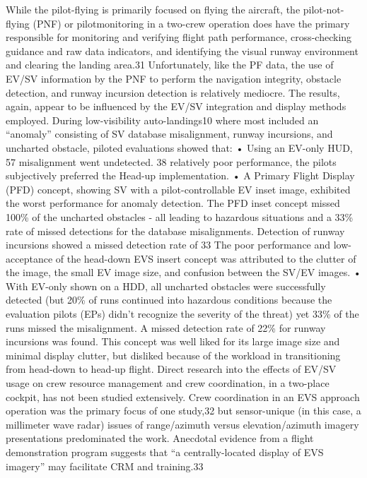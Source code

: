\documentclass[utf8,bachelor,manualbib]{gradu3}
\begin{document}
While the pilot-flying is primarily focused on flying the aircraft, the pilot-not-flying (PNF) or pilotmonitoring
in a two-crew operation does have the primary responsible for monitoring and verifying flight path
performance, cross-checking guidance and raw data indicators, and identifying the visual runway environment
and clearing the landing area.31 Unfortunately, like the PF data, the use of EV/SV information by the PNF to
perform the navigation integrity, obstacle detection, and runway incursion detection is relatively mediocre.
The results, again, appear to be influenced by the EV/SV integration and display methods employed.
During low-visibility auto-landings10 where most included an “anomaly” consisting of SV database
misalignment, runway incursions, and uncharted obstacle, piloted evaluations showed that:
• Using an EV-only HUD, 57%
misalignment went undetected. 38%
relatively poor performance, the pilots subjectively preferred the Head-up implementation.
• A Primary Flight Display (PFD) concept, showing SV with a pilot-controllable EV inset image,
exhibited the worst performance for anomaly detection. The PFD inset concept missed 100\% of the
uncharted obstacles - all leading to hazardous situations and a 33\% rate of missed detections for the
database misalignments. Detection of runway incursions showed a missed detection rate of 33%
The poor performance and low-acceptance of the head-down EVS insert concept was attributed to the
clutter of the image, the small EV image size, and confusion between the SV/EV images.
• With EV-only shown on a HDD, all uncharted obstacles were successfully detected (but 20\% of runs
continued into hazardous conditions because the evaluation pilots (EPs) didn’t recognize the severity
of the threat) yet 33\% of the runs missed the misalignment. A missed detection rate of 22\% for
runway incursions was found. This concept was well liked for its large image size and minimal
display clutter, but disliked because of the workload in transitioning from head-down to head-up
flight.
Direct research into the effects of EV/SV usage on crew resource management and crew coordination, in a
two-place cockpit, has not been studied extensively. Crew coordination in an EVS approach operation was
the primary focus of one study,32 but sensor-unique (in this case, a millimeter wave radar) issues of
range/azimuth versus elevation/azimuth imagery presentations predominated the work. Anecdotal evidence
from a flight demonstration program suggests that “a centrally-located display of EVS imagery” may facilitate
CRM and training.33 \citep{baileyym2007}
\end{document}
